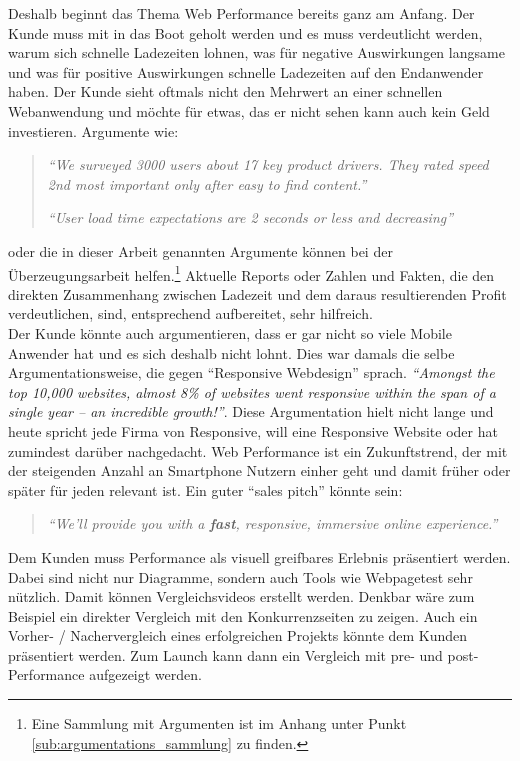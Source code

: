 	Deshalb beginnt das Thema Web Performance bereits ganz am Anfang. Der Kunde muss mit in das Boot geholt werden und es muss verdeutlicht werden, warum sich schnelle Ladezeiten lohnen, was für negative Auswirkungen langsame und was für positive Auswirkungen schnelle Ladezeiten auf den Endanwender haben. Der Kunde sieht oftmals nicht den Mehrwert an einer schnellen Webanwendung und möchte für etwas, das er nicht sehen kann auch kein Geld investieren. Argumente wie:
	\begin{quote}
		\textit{"`We surveyed 3000 users about 17 key product drivers. They rated speed 2nd most important only after easy to find content."'} \autocite[p. 8]{hamann14}

		\textit{"`User load time expectations are 2 seconds or less and decreasing"'} \autocite{bixby13}
	\end{quote}
	oder die in dieser Arbeit genannten Argumente können bei der Überzeugungsarbeit helfen.\footnote{Eine Sammlung mit Argumenten ist im Anhang unter Punkt \ref{sub:argumentations_sammlung} zu finden.} Aktuelle Reports oder Zahlen und Fakten, die den direkten Zusammenhang zwischen Ladezeit und dem daraus resultierenden Profit verdeutlichen, sind, entsprechend aufbereitet, sehr hilfreich.\\
	Der Kunde könnte auch argumentieren, dass er gar nicht so viele Mobile Anwender hat und es sich deshalb nicht lohnt. Dies war damals die selbe Argumentationsweise, die gegen "`Responsive Webdesign"' sprach. \textit{"`Amongst the top 10,000 websites, almost 8\% of websites went responsive within the span of a single year – an incredible growth!"'}\autocite{guypo14}. Diese Argumentation hielt nicht lange und heute spricht jede Firma von Responsive, will eine Responsive Website oder hat zumindest darüber nachgedacht.\autocite{guypo14} Web Performance ist ein Zukunftstrend, der mit der steigenden Anzahl an Smartphone Nutzern einher geht und damit früher oder später für jeden relevant ist. Ein guter "`sales pitch"' könnte sein:
	\begin{quote}
		 \textit{"`We'll provide you with a \textbf{fast}, responsive, immersive online experience."'}\autocite[p. 32]{kovalcin15}
	\end{quote}
	Dem Kunden muss Performance als visuell greifbares Erlebnis präsentiert werden. Dabei sind nicht nur Diagramme, sondern auch Tools wie Webpagetest sehr nützlich. Damit können Vergleichsvideos erstellt werden. Denkbar wäre zum Beispiel ein direkter Vergleich mit den Konkurrenzseiten zu zeigen. Auch ein Vorher- / Nachervergleich eines erfolgreichen Projekts könnte dem Kunden präsentiert werden. Zum Launch kann dann ein Vergleich mit pre- und post-Performance aufgezeigt werden.\\

